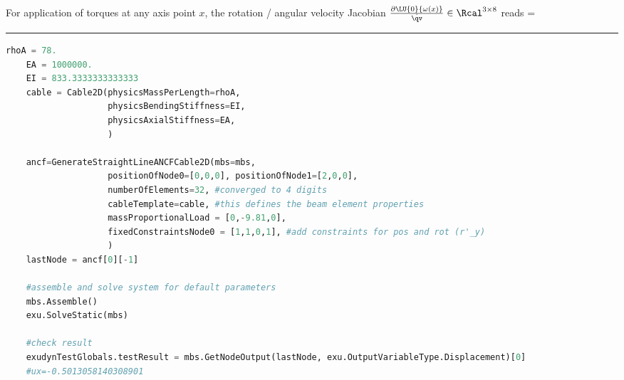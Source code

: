     For application of torques at any axis point $x$, the rotation / angular velocity Jacobian $\frac{\partial \LU{0}{\omega(x)}}{\dot \qv} \in \Rcal^{3 \times 8}$ reads
    \be
       = 
    \ee
\vspace{6pt}\par\noindent\rule{\textwidth}{0.4pt}
\label{miniExample_ObjectANCFCable2D}
\pythonstyle
\begin{lstlisting}[language=Python, firstnumber=1]
    rhoA = 78.
    EA = 1000000.
    EI = 833.3333333333333
    cable = Cable2D(physicsMassPerLength=rhoA, 
                    physicsBendingStiffness=EI, 
                    physicsAxialStiffness=EA, 
                    )

    ancf=GenerateStraightLineANCFCable2D(mbs=mbs,
                    positionOfNode0=[0,0,0], positionOfNode1=[2,0,0],
                    numberOfElements=32, #converged to 4 digits
                    cableTemplate=cable, #this defines the beam element properties
                    massProportionalLoad = [0,-9.81,0],
                    fixedConstraintsNode0 = [1,1,0,1], #add constraints for pos and rot (r'_y)
                    )
    lastNode = ancf[0][-1]

    #assemble and solve system for default parameters
    mbs.Assemble()
    exu.SolveStatic(mbs)

    #check result
    exudynTestGlobals.testResult = mbs.GetNodeOutput(lastNode, exu.OutputVariableType.Displacement)[0]
    #ux=-0.5013058140308901
\end{lstlisting}

